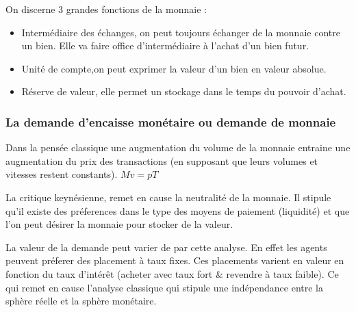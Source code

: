 On discerne 3 grandes fonctions de la monnaie : 

\begin{itemize}[label=]
	\item Intermédiaire des échanges, on peut toujours échanger de la monnaie contre un bien. Elle va faire office d'intermédiaire à l'achat d'un bien futur.
	\item Unité de compte,on peut exprimer la valeur d'un bien en valeur absolue.
	\item Réserve de valeur, elle permet un stockage dans le temps du pouvoir d'achat.
\end{itemize}


\subsubsection{La demande d'encaisse monétaire ou demande de monnaie} %
\label{sub:la_demande_d_encaisse_monetaire_ou_demande_de_monnaie}
Dans la pensée classique une augmentation du volume de la monnaie entraine une augmentation du prix des transactions (en supposant que leurs volumes et vitesses restent constants). $Mv=pT$

La critique keynésienne, remet en cause la neutralité de la monnaie. Il stipule qu'il existe des préferences dans le type des moyens de paiement (liquidité) et que l'on peut désirer la monnaie pour stocker de la valeur.

La valeur de la demande peut varier de par cette analyse. En effet les agents peuvent préferer des placement à taux fixes. Ces placements varient en valeur
en fonction du taux d'intérêt (acheter avec taux fort \& revendre à taux faible). Ce qui remet en cause l'analyse classique qui stipule une indépendance entre 
la sphère réelle et la sphère monétaire.

